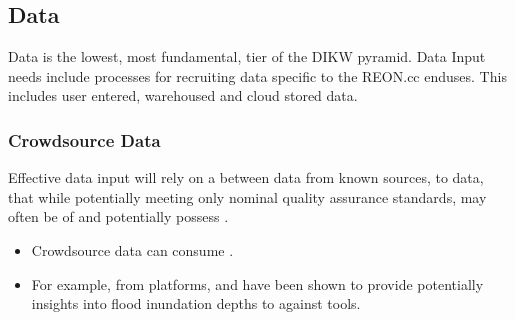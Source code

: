 \documentclass[letterpaper,12pt,english]{book}
\begin{document}
\subsection{Data}
\label{\detokenize{requirements/data/index:data}}\label{\detokenize{requirements/data/index::doc}}
\sphinxAtStartPar
Data is the lowest, most fundamental, tier of the DIKW pyramid. Data Input needs include processes for recruiting data specific to the REON.cc end\sphinxhyphen{}uses. This includes user entered, warehoused and cloud stored data.


\subsubsection{Crowdsource Data}
\label{\detokenize{requirements/data/crowdsource:crowdsource-data}}\label{\detokenize{requirements/data/crowdsource::doc}}
\sphinxAtStartPar
Effective data input will rely on a  between  data from known sources, to  data, that while potentially meeting only nominal quality assurance standards, may often be of  and potentially possess .
\begin{itemize}
\item {} 
\sphinxAtStartPar
Crowdsource data can consume .

\item {} 
\sphinxAtStartPar
For example,  from  platforms,  and  have been shown to provide potentially  insights into flood inundation depths to  against  tools.

\end{itemize}
\end{document}
